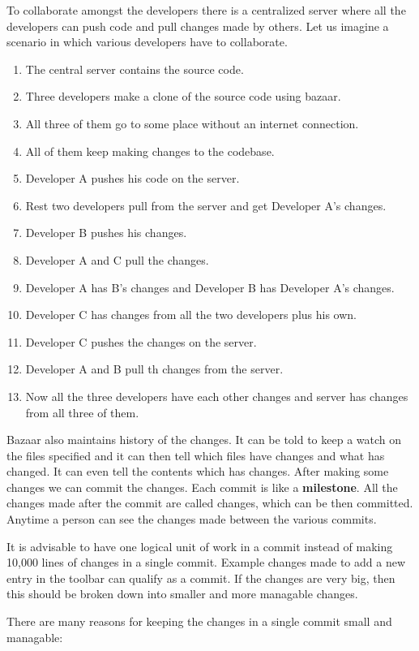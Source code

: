 To collaborate amongst the developers there is a centralized server where all the 
developers can push code and pull changes made by others. Let us imagine a scenario 
in which various developers have to collaborate.
\begin{enumerate}
\item The central server contains the source code.
\item Three developers make a clone of the source code using bazaar.
\item All three of them go to some place without an internet connection.
\item All of them keep making changes to the codebase.
\item Developer A pushes his code on the server.
\item Rest two developers pull from the server and get Developer A's changes.
\item Developer B pushes his changes.
\item Developer A and C pull the changes.
\item Developer A has B's changes and Developer B has Developer A's changes.
\item Developer C has changes from all the two developers plus his own.
\item Developer C pushes the changes on the server.
\item Developer A and B pull th changes from the server.
\item Now all the three developers have each other changes and server has changes 
from all three of them.
\end{enumerate}

Bazaar also maintains history of the changes. It can be told to keep a watch on the 
files specified and it can then tell which files have changes and what has changed. It 
can even tell the contents which has changes. After making some changes we can commit the 
changes. Each commit is like a \textbf{milestone}. All the changes made after the commit are 
called changes, which can be then committed. Anytime a person can see the changes 
made between the various commits. 

It is advisable to have one logical unit of work in a commit instead of making 10,000 
lines of changes in a single commit. Example changes made to add a new entry in the toolbar 
can qualify as a commit. If the changes are very big, then this should be broken down into 
smaller and more managable changes. 

There are many reasons for keeping the changes in a single commit small and managable: 

